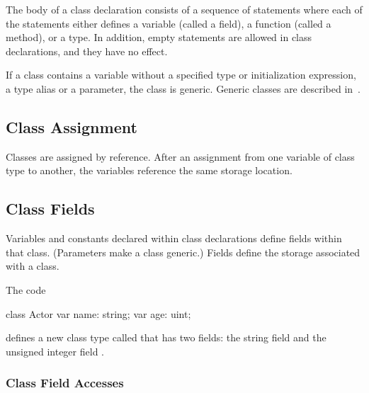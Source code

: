 The body of a class declaration consists of a sequence of statements
where each of the statements either defines a variable (called a
field), a function (called a method), or a type.  In addition, empty
statements are allowed in class declarations, and they have no effect.

If a class contains a variable without a specified type or
initialization expression, a type alias or a parameter, the class is
generic.  Generic classes are described in~.

\subsection{Class Assignment}
\label{Class_Assignment}

Classes are assigned by reference.  After an assignment from one
variable of class type to another, the variables reference the same
storage location.

\subsection{Class Fields}
\label{Class_Fields}

Variables and constants declared within class declarations define
fields within that class.  (Parameters make a class generic.)  Fields
define the storage associated with a class.

\begin{example}
The code
\begin{chapelpre}
\end{chapelpre}
\begin{chapel}
class Actor {
  var name: string;
  var age: uint;
}
\end{chapel}
\begin{chapeloutput}
\end{chapeloutput}
defines a new class type called  that has two fields: the
string field  and the unsigned integer field .
\end{example}

\subsubsection{Class Field Accesses}
\label{Class_Field_Accesses}

